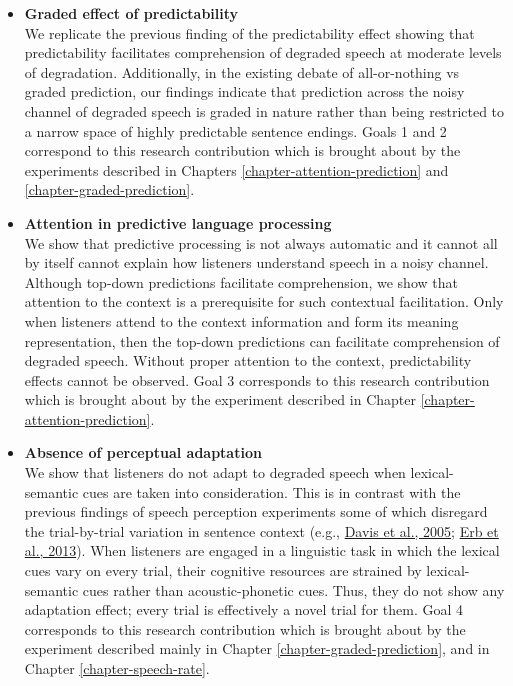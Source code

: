 \documentclass[a4paper, nobind]{templates/ociamthesis}
\begin{document}
\begin{itemize}
\item
  \textbf{Graded effect of predictability}\\
  We replicate the previous finding of the predictability effect showing that predictability facilitates comprehension of degraded speech at moderate levels of degradation.
  Additionally, in the existing debate of all-or-nothing vs graded prediction, our findings indicate that prediction across the noisy channel of degraded speech is graded in nature
  rather than being restricted to a narrow space of highly predictable sentence endings.
  Goals 1 and 2 correspond to this research contribution which is brought about by the experiments described in Chapters \ref{chapter-attention-prediction} and \ref{chapter-graded-prediction}.
\item
  \textbf{Attention in predictive language processing}\\
  We show that predictive processing is not always automatic and it cannot all by itself cannot explain how listeners understand speech in a noisy channel.
  Although top-down predictions facilitate comprehension, we show that attention to the context is a prerequisite for such contextual facilitation.
  Only when listeners attend to the context information and form its meaning representation, then the top-down predictions can facilitate comprehension of degraded speech.
  Without proper attention to the context, predictability effects cannot be observed.
  Goal 3 corresponds to this research contribution which is brought about by the experiment described in Chapter \ref{chapter-attention-prediction}.
\item
  \textbf{Absence of perceptual adaptation}\\
  We show that listeners do not adapt to degraded speech when lexical-semantic cues are taken into consideration.
  This is in contrast with the previous findings of speech perception experiments some of which disregard the trial-by-trial variation in sentence context (e.g., \protect\hyperlink{ref-Davis2005}{Davis et al., 2005}; \protect\hyperlink{ref-Erb2013}{Erb et al., 2013}).
  When listeners are engaged in a linguistic task in which the lexical cues vary on every trial,
  their cognitive resources are strained by lexical-semantic cues rather than acoustic-phonetic cues.
  Thus, they do not show any adaptation effect;
  every trial is effectively a novel trial for them.
  Goal 4 corresponds to this research contribution which is brought about by the experiment described mainly in Chapter \ref{chapter-graded-prediction}, and in Chapter \ref{chapter-speech-rate}.

\end{itemize}
\end{document}
